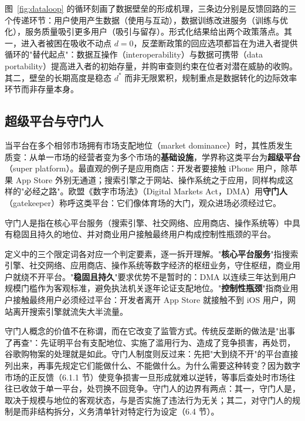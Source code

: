 图~\ref{fig:dataloop} 的循环刻画了数据壁垒的形成机理，三条边分别是反馈回路的三个传递环节：用户使用产生数据（使用与互动），数据训练改进服务（训练与优化），服务质量吸引更多用户（吸引与留存）。形式化结果给出两个政策落点。其一，进入者被困在吸收不动点 $d = 0$，反垄断政策的回应选项都旨在为进入者提供循环的"替代起点"：数据互操作（interoperability）与数据可携带（data portability）提高进入者的初始存量，并购审查则约束在位者对潜在威胁的收购。其二，壁垒的长期高度是稳态 $d^{*}$ 而非无限累积，规制重点是数据转化的边际效率环节而非存量本身。

\subsection{超级平台与守门人}

当平台在多个相邻市场拥有市场支配地位（market dominance）时，其性质发生质变：从单一市场的经营者变为多个市场的\textbf{基础设施}，学界称这类平台为\textbf{超级平台}（super platform）。最直观的例子是应用商店：开发者要接触 iPhone 用户，除苹果 App Store 外别无通道；搜索引擎之于网站、操作系统之于应用，同样构成这样的"必经之路"。欧盟《数字市场法》（Digital Markets Act，DMA）用\textbf{守门人}（gatekeeper）称呼这类平台：它们像体育场的大门，观众进场必须经过它。

\begin{definition}
守门人是指在核心平台服务（搜索引擎、社交网络、应用商店、操作系统等）中具有稳固且持久的地位、并对商业用户接触最终用户构成控制性瓶颈的平台。
\end{definition}

定义中的三个限定词各对应一个判定要素，逐一拆开理解。"\textbf{核心平台服务}"指搜索引擎、社交网络、应用商店、操作系统等数字经济的枢纽业务，守住枢纽，商业用户就绕不开平台。"\textbf{稳固且持久}"要求优势不是暂时的：DMA 以连续三年达到用户规模门槛作为客观标准，避免执法机关逐年论证支配地位。"\textbf{控制性瓶颈}"指商业用户接触最终用户必须经过平台：开发者离开 App Store 就接触不到 iOS 用户，网站离开搜索引擎就流失大半流量。

守门人概念的价值不在称谓，而在它改变了监管方式。传统反垄断的做法是"出事了再查"：先证明平台有支配地位、实施了滥用行为、造成了竞争损害，再处罚，谷歌购物案的处理就是如此。守门人制度则反过来：先把"大到绕不开"的平台直接列出来，再事先规定它们能做什么、不能做什么。为什么需要这种转变？因为数字市场的正反馈（6.1.1 节）使竞争损害一旦形成就难以逆转，等事后查处时市场往往已收敛于单一平台，处罚换不回竞争。守门人的边界有两点：其一，守门人是，取决于规模与地位的客观状态，与是否实施了违法行为无关；其二，对守门人的规制是而非结构拆分，义务清单针对特定行为设定（6.4 节）。

